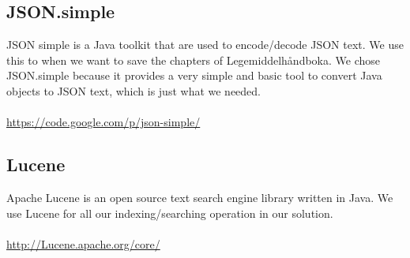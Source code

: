 \subsection*{JSON.simple}
JSON simple is a Java toolkit that are used to encode/decode JSON text. We use
this to when we want to save the chapters of Legemiddelhåndboka. We chose
JSON.simple because it provides a very simple and basic tool to convert Java
objects to JSON text, which is just what we needed.\\\\
\url{https://code.google.com/p/json-simple/}

\subsection*{Lucene}
Apache Lucene is an open source text search engine library written in Java. We
use Lucene for all our indexing/searching operation in our solution.\\\\
\url{http://Lucene.apache.org/core/}

